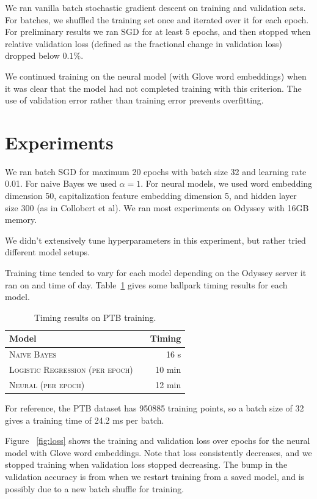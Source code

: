 \documentclass[11pt]{article}
\begin{document}
We ran vanilla batch stochastic gradient descent on training and validation sets. For batches, we shuffled the training set once and iterated over it for each epoch. For preliminary results we ran SGD for at least 5 epochs, and then stopped when relative validation loss (defined as the fractional change in validation loss) dropped below $0.1\%$.

We continued training on the neural model (with Glove word embeddings) when it was clear that the model had not completed training with this criterion. The use of validation error rather than training error prevents overfitting.

\section{Experiments}

We ran batch SGD for maximum 20 epochs with batch size 32 and learning rate 0.01. For naive Bayes we used $\alpha = 1$. For neural models, we used word embedding dimension 50, capitalization feature embedding dimension 5, and hidden layer size 300 (as in Collobert et al). We ran most experiments on Odyssey with 16GB memory.

We didn't extensively tune hyperparameters in this experiment, but rather tried different model setups.

Training time tended to vary for each model depending on the Odyssey server it ran on and time of day. Table~\ref{tab:timings} gives some ballpark timing results for each model.

\begin{table}[h]
\centering
\begin{tabular}{llr}
 \toprule
 Model &  & Timing \\
 \midrule
 \textsc{Naive Bayes} & & 16 s\\
 \textsc{Logistic Regression (per epoch)} & & 10 min \\
 \textsc{Neural (per epoch)} & &12 min \\
 \bottomrule
\end{tabular}
\caption{\label{tab:timings} Timing results on PTB training.}
\end{table}

For reference, the PTB dataset has 950885 training points, so a batch size of 32 gives a training time of 24.2 ms per batch. 

Figure ~\ref{fig:loss} shows the training and validation loss over epochs for the neural model with Glove word embeddings. Note that loss consistently decreases, and we stopped training when validation loss stopped decreasing. The bump in the validation accuracy is from when we restart training from a saved model, and is possibly due to a new batch shuffle for training.
\end{document}
